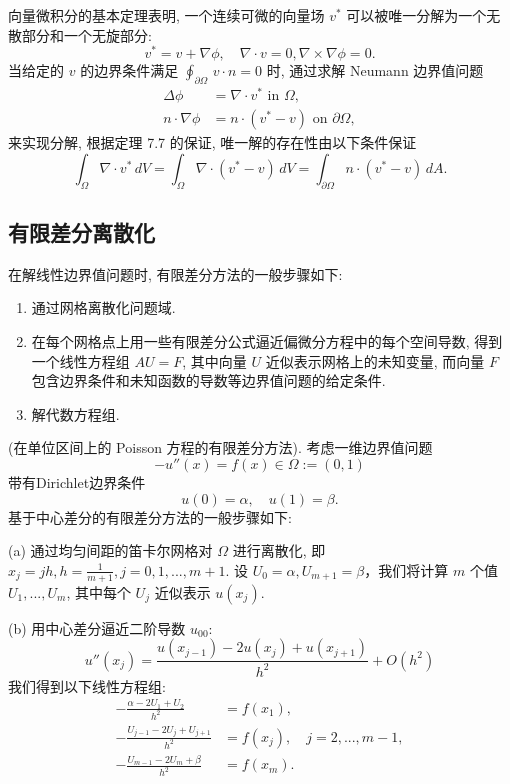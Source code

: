 \documentclass[a4paper]{ctexart}
\newcommand{\hl}[1]
{\noindent {\bf {#1}}}
\begin{document}
\hl{例子 7.8} 向量微积分的基本定理表明, 
一个连续可微的向量场 $v^*$ 可以被唯一分解为一个无散部分和一个无旋部分:
$$
v^* = v + \nabla \phi, \quad \nabla \cdot v = 0, 
\nabla \times \nabla \phi = 0. 
$$
当给定的 $v$ 的边界条件满足 
$\oint_{\partial \Omega} \, v \cdot n = 0$ 时, 
通过求解 Neumann 边界值问题
\begin{align*}
\Delta \phi &= \nabla \cdot v^* \text{ in } \Omega,\\
n \cdot \nabla \phi &= n \cdot (v^* - v) \text{ on } \partial \Omega, 
\end{align*}
来实现分解, 根据定理 7.7 的保证, 唯一解的存在性由以下条件保证
$$
\int_{\Omega} \nabla \cdot v^* \, 
dV = \int_{\Omega} \nabla \cdot (v^* - v) \, 
dV = \int_{\partial \Omega} n \cdot (v^* - v) \, dA.
$$

\subsection{有限差分离散化}

\hl{公式 7.9} 在解线性边界值问题时, 有限差分方法的一般步骤如下:


\begin{enumerate}
  \item 通过网格离散化问题域.
  \item 在每个网格点上用一些有限差分公式逼近偏微分方程中的每个空间导数, 
  得到一个线性方程组 $AU = F$, 其中向量 $U$ 近似表示网格上的未知变量, 
  而向量 $F$ 包含边界条件和未知函数的导数等边界值问题的给定条件.
  \item 解代数方程组. 
\end{enumerate}

\hl{例子 7.10} (在单位区间上的 Poisson 方程的有限差分方法). 考虑一维边界值问题
$$
-u''(x) = f(x) \in \Omega := (0, 1) 
$$
带有Dirichlet边界条件
$$
u(0) = \alpha, \quad u(1) = \beta. 
$$
基于中心差分的有限差分方法的一般步骤如下:

\noindent (a) 通过均匀间距的笛卡尔网格对 $\Omega$ 进行离散化, 
即 $x_j = jh, h = \frac{1}{m+1}, j = 0, 1, . . . , m + 1$. 
设 $U_0 = \alpha, U_{m+1} = \beta$，我们将计算 $m$ 个值 $U_1, . . . , U_m$, 
其中每个 $U_j$ 近似表示 $u(x_j)$. 

\noindent (b) 用中心差分逼近二阶导数 $u_{00}$:
$$
u''(x_j) = \frac{u(x_{j-1}) - 2u(x_j) + u(x_{j+1})}{h^2} + O(h^2)
$$
我们得到以下线性方程组:
\begin{align*}
-\frac{\alpha - 2U_1 + U_2}{h^2} &= f(x_1), \\
-\frac{U_{j-1} - 2U_j + U_{j+1}}{h^2} &= f(x_j), \quad j = 2, . . . , m - 1, \\
-\frac{U_{m-1} - 2U_m + \beta}{h^2} &= f(x_m).
\end{align*}
\end{document}
